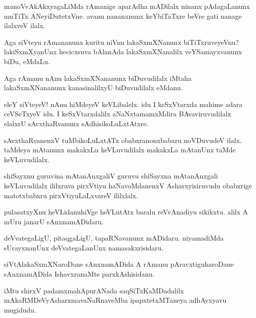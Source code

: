 \begin{mng}
manoVvAkAkxyagaLiMda rAmanige aparAdha mADilalx ninanx pAdagaLanunx muTiTx ANeyiDutetxVne. avanu nananxnunx keYbiTaTxre beVre gati nanage ilalxveV ilalx.
\end{mng}

\begin{mng}
Aga siVteyu rAmananunx kuritu niVnu lakaSxmXNanunx biTiTxruveyeVnu? lakiSxmXyanUnx hecicxsuva bAlanAda lakaSxmXNanalilx veYSamayxvanunx biDu, eMdaLu.
\end{mng}

\begin{mng}
Aga rAmanu nAnu lakaSxmXNananunx biDuvudilalx iMtaha lakaSxmXNananunx kanasinalilxyU biDuvudilalx eMdanu.
\end{mng}

\begin{mng}
eleY siVteyeV! nAnu hiMdeyeV keVLibalelx. idu I keSxVtarxda mahime adara ceVSeTxyeV idu. I keSxVtarxdalilx aNaNxtamamxMdira BAvaviruvudilalx elalxrU sAvxthaRvanunx sAdhisikoLuLxtAtxre.
\end{mng}

\begin{mng}
sAvxthaRvanenxV tuMbikoLuLxtATx obabxranonxbabxru noVDuvudeV ilalx. taMdeya mAtanunx makakxLu keVLuvudilalx makakxLa mAtanUnx  taMde keVLuvudilalx.
\end{mng}

\begin{mng}
shiSayxnu guruvina mAtanAnxgaliV guruvu shiSayxna mAtanAnxgali keVLuvudilalx ililxruva pirxVtiyu haNavoMdanenxV Asharxyisiruvudu obabxrige matotxbabxru pirxVtiyuLaLxvareV ililxlalx.
\end{mng}

\begin{mng}
pulasatxyXnu heVLidanu\mdash hiVge heVLutAtx baralu reVvAnadiyu sikikxtu. alilx A mUru janarU sAnxnamADidaru.
\end{mng}

\begin{mng}
deVvategaLigU, pitaqgaLigU, tapaRNavanunx mADidaru. niyamadiMda sUrayxnanUnx deVvategaLanUnx namasakxrisidaru.
\end{mng}

\begin{mng}
siVtAlakaSxmXNaroDane sAnxnamADida A rAmanu pAravxtiguharoDane sAnxnamADida IshavxranaMte parxkAshisidanu.
\end{mng}
iMtu shirxV padamxmahApurANada saqSiTxKaMDadalilx mAkaRMDeVyAsharxmavaNaRnaveMba ipapxtetxMTaneya adhAyxyavu mugidudu.

